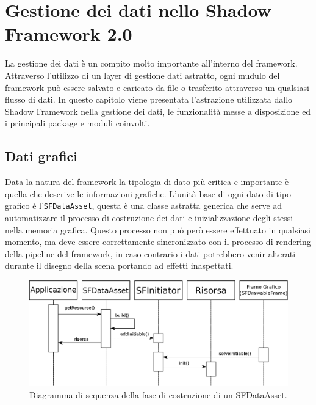 
\chapter{Gestione dei dati nello Shadow Framework 2.0}
\label{ch:gestionedati}

La gestione dei dati \`e un compito molto importante all'interno del framework. Attraverso l'utilizzo di un layer di gestione dati astratto, ogni mudulo del framework pu\`o essere salvato e caricato da file o trasferito attraverso un qualsiasi flusso di dati.
In questo capitolo viene presentata l'astrazione utilizzata dallo Shadow Framework nella gestione dei dati, le funzionalit\`a messe a disposizione ed i principali package e moduli coinvolti.

\section{Dati grafici}
\label{sec:dati grafici}
Data la natura del framework la tipologia di dato pi\`u critica e importante \`e quella che descrive le informazioni grafiche. 
L'unit\`a base di ogni dato di tipo grafico \`e l'\texttt{SFDataAsset}, questa \`e una classe astratta generica che serve ad automatizzare il processo di costruzione dei dati e inizializzazione degli stessi nella memoria grafica. Questo processo non pu\`o per\`o essere effettuato in qualsiasi momento, ma deve essere correttamente sincronizzato con il processo di rendering della pipeline del framework, in caso contrario i dati potrebbero venir alterati durante il disegno della scena portando ad effetti inaspettati.

\begin{figure}
\begin{center}
\includegraphics[width=\textwidth]{Immagini/sequenzaDataAsset}
\caption{Diagramma di sequenza della fase di costruzione di un SFDataAsset.\label{f:seqdataasset}} 
\end{center} 
\end{figure}

